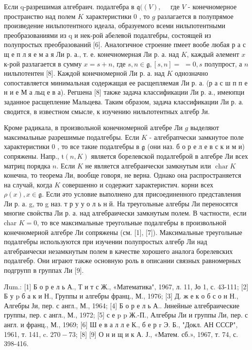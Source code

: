 \documentclass[10pt]{article}
\begin{document}
Если q-разрешимая алгебраич. подалгебра в $\mathfrak{q}((V), \quad$ где $V$ - конечномерное пространство над полем $K$ характеристики 0 , то $g$ разлагается в полупрямое произведение нильпотентного идеала, образуемого всеми нильпотентными преобразованиями из q и нек-рой абелевой подалгебры, состоящей из полупростых преобразований [6]. Аналогичное строение пмеет вообе любая р а с щ е п л я е м а я Ли р. а., т. е. конечномерная Ли р. а. над $K$, каждый әлемент $x$ к-рой разлагается в сумму $x=s+n$, где $s, n \in \mathfrak{g},[s, n]=$ $=0, s$ полупрост, а $n$ нильпотентен [8]. Каждой конечномерной Ли р. а. над $K$ однозначно сопоставляется минимальная содержащая ее расщепляемая Ли р. а. (р а с ш п п е н и е М а льц е в а). Регшена [8] также задача классификации Ли р. а., имеюпци заданное расщепление Мальцева. Таким образом, задача классификации Ли р. а. сводится, в известном смысле, к изучению нильпотентных алгебр Ји.



Кроме радикала, в произвольной конечномерной алгебре Ли $g$ выделяют максимальные разрешимые подалгебры. Если $K$ - алгебрапчески замкнутое поле характеристики 0 , то все такие подалгебры в $\mathfrak{g}$ (они наз. б о р е л е в с к и м и) сопряжены. Напр., $\mathrm{t}(n, K)$ является борелевской подалгеброй в алгебре Ли всех матриц порядка $n$. Если $K$ не является алгебраически замкнутым или $\operatorname{char} K$ конечна, то теорема Ли, вообще говоря, не верна. Однако она распространяется на случай, когда $K$ совершенно и содержит характеристич. корни всех $\rho(x), x \in \mathfrak{g}$. Если әто условие выполнено для присоединенного представления Ли р. а. g, то g наз. т р у у о л ь н й. На треугольные алгебры Ли переносятся многие своӥства Ли р. а. над алгебраически замкнутым полем. В частности, если char $K=0$, то все максимальные треугольные подалгебры в произвольной конечномерной алгебре Ли сопряжены (см. [1], [7]). Максимальные треугольные подалгебры используются при изучении полупростых алгебр Ли над алгебраически незамкнутым полем в качестве хорошего аналога борелевских подалгебр. Они играют также основную роль в описании связных равномерных подгрупп в группах Ли [9].



Лum.: [1] Б о р е л ь А., Т и т с Ж., «Математика", 1967, л. 11, Јо 1, с. 43-111; [2] Б у $\mathrm{p}$ б а к и Н., Группы и алгебры франц., М., 1976; [3] Д. ж е к о б с о н Н., Алгебры Ји, пер. с англ., М., 1964; [4] Б о р е л ь А.. Јинейные алгебраические группы, пер. с англ., М., 1972; [5] с е p p Ж.-П., Алгебры Ли и группы Ли, пер. с англ. и франц., М., 1969; [6] Ш е в а л л е К., б е р r Э. Б., "Докл. АН СССР", 1961, т. 141, c. $270-73$; [8] [9] О н и щ и к А. Ј., «Матем. сб.», 1967, т. 74, с. 398-416.
\end{document}
